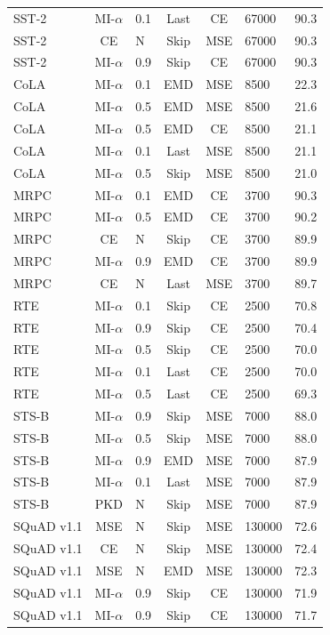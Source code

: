 \documentclass[11pt]{article}
\begin{document}
\begin{table}[b!]
{\begin{tabular}{lclccll}
SST-2 & MI-$\alpha$ & 0.1 & Last & CE & 67000 & 90.3 \\
SST-2 & CE & N & Skip & MSE & 67000 & 90.3 \\
SST-2 & MI-$\alpha$ & 0.9 & Skip & CE & 67000 & 90.3 \\ \hline
CoLA & MI-$\alpha$ & 0.1 & EMD & MSE & 8500 & 22.3 \\
CoLA & MI-$\alpha$ & 0.5 & EMD & MSE & 8500 & 21.6 \\
CoLA & MI-$\alpha$ & 0.5 & EMD & CE & 8500 & 21.1 \\
CoLA & MI-$\alpha$ & 0.1 & Last & MSE & 8500 & 21.1 \\
CoLA & MI-$\alpha$ & 0.5 & Skip & MSE & 8500 & 21.0 \\ \hline
MRPC & MI-$\alpha$ & 0.1 & EMD & CE & 3700 & 90.3 \\
MRPC & MI-$\alpha$ & 0.5 & EMD & CE & 3700 & 90.2 \\
MRPC & CE & N & Skip & CE & 3700 & 89.9 \\
MRPC & MI-$\alpha$ & 0.9 & EMD & CE & 3700 & 89.9 \\
MRPC & CE & N & Last & MSE & 3700 & 89.7 \\ \hline
RTE & MI-$\alpha$ & 0.1 & Skip & CE & 2500 & 70.8 \\
RTE & MI-$\alpha$ & 0.9 & Skip & CE & 2500 & 70.4 \\
RTE & MI-$\alpha$ & 0.5 & Skip & CE & 2500 & 70.0 \\
RTE & MI-$\alpha$ & 0.1 & Last & CE & 2500 & 70.0 \\
RTE & MI-$\alpha$ & 0.5 & Last & CE & 2500 & 69.3 \\\hline
STS-B & MI-$\alpha$ & 0.9 & Skip & MSE & 7000 & 88.0 \\
STS-B & MI-$\alpha$ & 0.5 & Skip & MSE & 7000 & 88.0 \\
STS-B & MI-$\alpha$ & 0.9 & EMD & MSE & 7000 & 87.9 \\
STS-B & MI-$\alpha$ & 0.1 & Last & MSE & 7000 & 87.9 \\
STS-B & PKD & N & Skip & MSE & 7000 & 87.9 \\
\hline
SQuAD v1.1 & MSE & N & Skip & MSE & 130000 & 72.6 \\
SQuAD v1.1 & CE & N & Skip & MSE & 130000 & 72.4 \\
SQuAD v1.1 & MSE & N & EMD & MSE & 130000 & 72.3 \\
SQuAD v1.1 & MI-$\alpha$ & 0.9 & Skip & CE & 130000 & 71.9 \\
SQuAD v1.1 & MI-$\alpha$ & 0.9 & Skip & CE & 130000 & 71.7 \\
 \bottomrule
\end{tabular}}
\label{tab:top5}
\end{table} 
\end{document}
